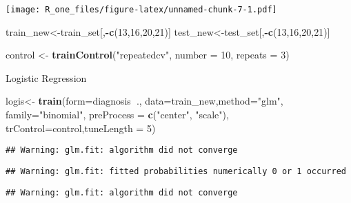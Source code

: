 \documentclass[]{article}
\newenvironment{Shaded}{\begin{snugshade}}{\end{snugshade}}
\newcommand{\DataTypeTok}[1]{\textcolor[rgb]{0.13,0.29,0.53}{#1}}
\newcommand{\DecValTok}[1]{\textcolor[rgb]{0.00,0.00,0.81}{#1}}
\newcommand{\KeywordTok}[1]{\textcolor[rgb]{0.13,0.29,0.53}{\textbf{#1}}}
\newcommand{\NormalTok}[1]{#1}
\newcommand{\OperatorTok}[1]{\textcolor[rgb]{0.81,0.36,0.00}{\textbf{#1}}}
\newcommand{\StringTok}[1]{\textcolor[rgb]{0.31,0.60,0.02}{#1}}
\begin{document}
\texttt{[image: R\_one\_files/figure-latex/unnamed-chunk-7-1.pdf]}

\begin{Shaded}
\begin{Highlighting}[]
\NormalTok{train_new<-train_set[,}\OperatorTok{-}\KeywordTok{c}\NormalTok{(}\DecValTok{13}\NormalTok{,}\DecValTok{16}\NormalTok{,}\DecValTok{20}\NormalTok{,}\DecValTok{21}\NormalTok{)]}
\NormalTok{test_new<-test_set[,}\OperatorTok{-}\KeywordTok{c}\NormalTok{(}\DecValTok{13}\NormalTok{,}\DecValTok{16}\NormalTok{,}\DecValTok{20}\NormalTok{,}\DecValTok{21}\NormalTok{)]}
\end{Highlighting}
\end{Shaded}

\begin{Shaded}
\begin{Highlighting}[]
\NormalTok{control <-}\StringTok{ }\KeywordTok{trainControl}\NormalTok{(}\StringTok{"repeatedcv"}\NormalTok{, }\DataTypeTok{number =} \DecValTok{10}\NormalTok{, }\DataTypeTok{repeats =} \DecValTok{3}\NormalTok{)}
\end{Highlighting}
\end{Shaded}

Logistic Regression

\begin{Shaded}
\begin{Highlighting}[]
\NormalTok{logis<-}\StringTok{ }\KeywordTok{train}\NormalTok{(}\DataTypeTok{form=}\NormalTok{diagnosis}\OperatorTok{~}\NormalTok{., }\DataTypeTok{data=}\NormalTok{train_new,}\DataTypeTok{method=}\StringTok{"glm"}\NormalTok{, }\DataTypeTok{family=}\StringTok{"binomial"}\NormalTok{, }\DataTypeTok{preProcess =} \KeywordTok{c}\NormalTok{(}\StringTok{"center"}\NormalTok{, }\StringTok{"scale"}\NormalTok{), }\DataTypeTok{trControl=}\NormalTok{control,}\DataTypeTok{tuneLength =} \DecValTok{5}\NormalTok{)}
\end{Highlighting}
\end{Shaded}

\begin{verbatim}
## Warning: glm.fit: algorithm did not converge
\end{verbatim}

\begin{verbatim}
## Warning: glm.fit: fitted probabilities numerically 0 or 1 occurred
\end{verbatim}

\begin{verbatim}
## Warning: glm.fit: algorithm did not converge
\end{verbatim}
\end{document}
